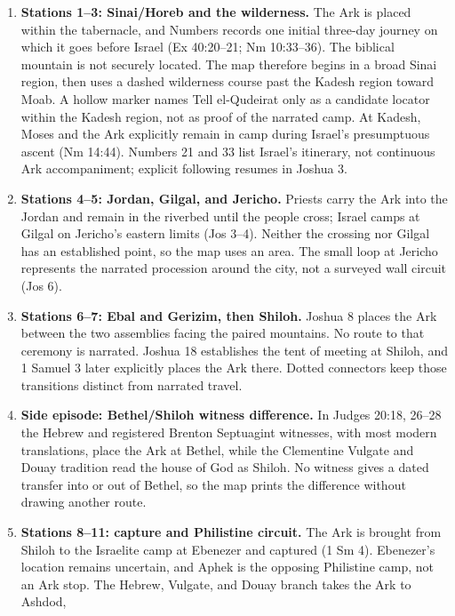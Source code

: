 \begin{enumerate}[leftmargin=2.0em]
  \item \textbf{Stations 1--3: Sinai/Horeb and the wilderness.} The Ark is placed within the
    tabernacle, and Numbers records one initial three-day journey on which it
    goes before Israel (Ex 40:20--21; Nm 10:33--36).  The biblical mountain is
    not securely located.  The map therefore begins in a broad Sinai region,
    then uses a dashed wilderness course past the Kadesh region toward Moab.
    A hollow marker names Tell el-Qudeirat only as a candidate locator within
    the Kadesh region, not as proof of the narrated camp.  At Kadesh, Moses and
    the Ark explicitly remain in camp during Israel's presumptuous ascent
    (Nm 14:44).  Numbers 21 and 33 list Israel's itinerary, not continuous Ark
    accompaniment; explicit following resumes in Joshua 3.
  \item \textbf{Stations 4--5: Jordan, Gilgal, and Jericho.} Priests carry the Ark into the
    Jordan and remain in the riverbed until the people cross; Israel camps at
    Gilgal on Jericho's eastern limits (Jos 3--4).  Neither the crossing nor
    Gilgal has an established point, so the map uses an area.  The small loop
    at Jericho represents the narrated procession around the city, not a
    surveyed wall circuit (Jos 6).
  \item \textbf{Stations 6--7: Ebal and Gerizim, then Shiloh.} Joshua 8 places the Ark between
    the two assemblies facing the paired mountains.  No route to that ceremony
    is narrated.  Joshua 18 establishes the tent of meeting at Shiloh, and
    1 Samuel 3 later explicitly places the Ark there.  Dotted connectors keep
    those transitions distinct from narrated travel.
  \item \textbf{Side episode: Bethel/Shiloh witness difference.} In Judges
    20:18, 26--28 the Hebrew and registered Brenton Septuagint witnesses, with
    most modern translations, place the Ark at Bethel, while the Clementine
    Vulgate and Douay tradition read the house of God as Shiloh.  No witness
    gives a dated transfer into or out of Bethel, so
    the map prints the difference without drawing another route.
  \item \textbf{Stations 8--11: capture and Philistine circuit.} The Ark is brought from
    Shiloh to the Israelite camp at Ebenezer and captured (1 Sm 4).  Ebenezer's
    location remains uncertain, and Aphek is the opposing Philistine camp, not
    an Ark stop.  The Hebrew, Vulgate, and Douay branch takes the Ark to Ashdod,

\end{enumerate}
